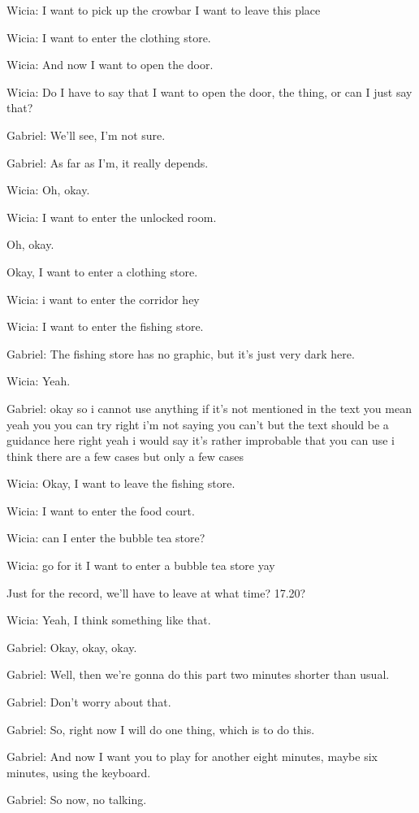 Wicia: I want to pick up the crowbar I want to leave this place

Wicia: I want to enter the clothing store.

Wicia: And now I want to open the door.

Wicia: Do I have to say that I want to open the door, the thing, or can I just say that?

Gabriel: We'll see, I'm not sure.

Gabriel: As far as I'm, it really depends.

Wicia: Oh, okay.

Wicia: I want to enter the unlocked room.

Oh, okay.

Okay, I want to enter a clothing store.

Wicia: i want to enter the corridor hey

Wicia: I want to enter the fishing store.

Gabriel: The fishing store has no graphic, but it's just very dark here.

Wicia: Yeah.

Gabriel: okay so i cannot use anything if it's not mentioned in the text you mean yeah you you can try right i'm not saying you can't but the text should be a guidance here right yeah i would say it's rather improbable that you can use i think there are a few cases but only a few cases

Wicia: Okay, I want to leave the fishing store.

Wicia: I want to enter the food court.

Wicia: can I enter the bubble tea store?

Wicia: go for it I want to enter a bubble tea store yay

Just for the record, we'll have to leave at what time? 17.20?

Wicia: Yeah, I think something like that.

Gabriel: Okay, okay, okay.

Gabriel: Well, then we're gonna do this part two minutes shorter than usual.

Gabriel: Don't worry about that.

Gabriel: So, right now I will do one thing, which is to do this.

Gabriel: And now I want you to play for another eight minutes, maybe six minutes, using the keyboard.

Gabriel: So now, no talking.

